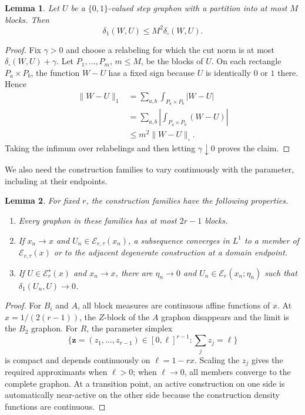 \documentclass[10pt]{article}
\numberwithin{equation}{section}
\newtheorem{lemma}[lemma]{Lemma}
\newcommand{\vct}[1]{\boldsymbol{#1}}
\newcommand{\cE}{\mathcal E}
\newcommand{\distone}{\delta_1}
\newcommand{\distsq}{\delta_\square}
\begin{document}
\begin{lemma}\label{lem:cut-L1}
Let $U$ be a $\{0,1\}$-valued step graphon with a partition into at most $M$ blocks.  Then
\[
 \distone(W,U)\le M^2\distsq(W,U).
\]
\end{lemma}

\begin{proof}
Fix $\gamma>0$ and choose a relabeling for which the cut norm is at most $\distsq(W,U)+\gamma$.  Let $P_1,\ldots,P_m$, $m\le M$, be the blocks of $U$.  On each rectangle $P_a\times P_b$, the function $W-U$ has a fixed sign because $U$ is identically $0$ or $1$ there.  Hence
\[
 \begin{aligned}
 \|W-U\|_1
 &=\sum_{a,b}\int_{P_a\times P_b}|W-U|\\
 &=\sum_{a,b}\left|\int_{P_a\times P_b}(W-U)\right|\\
 &\le m^2\|W-U\|_\square.
 \end{aligned}
\]
Taking the infimum over relabelings and then letting $\gamma\downarrow0$ proves the claim.
\end{proof}

We also need the construction families to vary continuously with the parameter, including at their endpoints.

\begin{lemma}\label{lem:construction-continuity}
For fixed $r$, the construction families have the following properties.
\begin{enumerate}[label=\textup{(\roman*)}]
\item Every graphon in these families has at most $2r-1$ blocks.
\item If $x_n\to x$ and $U_n\in\cE_{r,\tau}(x_n)$, a subsequence converges in $L^1$ to a member of $\cE_{r,\tau}(x)$ or to the adjacent degenerate construction at a domain endpoint.
\item If $U\in\cE_r^\star(x)$ and $x_n\to x$, there are $\eta_n\to0$ and $U_n\in\cE_r(x_n;\eta_n)$ such that $\distone(U_n,U)\to0$.
\end{enumerate}
\end{lemma}

\begin{proof}
For $B_i$ and $A$, all block measures are continuous affine functions of $x$.  At $x=1/(2(r-1))$, the $Z$-block of the $A$ graphon disappears and the limit is the $B_2$ graphon.  For $R$, the parameter simplex
\[
 \{\vct z=(z_1,\ldots,z_{r-1})\in[0,\ell]^{r-1}\colon
   \sum_jz_j=\ell\}
\]
is compact and depends continuously on $\ell=1-rx$.  Scaling the $z_j$ gives the required approximants when $\ell>0$; when $\ell\to0$, all members converge to the complete graphon.  At a transition point, an active construction on one side is automatically near-active on the other side because the construction density functions are continuous.
\end{proof}
\end{document}
